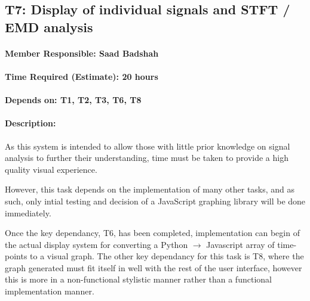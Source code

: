 \documentclass[
  paper=a4,
  ,captions=tableheading
]{scrartcl}
\begin{document}
\newpage
\hypertarget{t7-display-of-individual-signals-and-stft-emd-analysis}{%
\subsection{T7: Display of individual signals and STFT / EMD
analysis}\label{t7-display-of-individual-signals-and-stft-emd-analysis}}

\hypertarget{member-responsible-saad-badshah}{%
\paragraph{Member Responsible: Saad
Badshah}\label{member-responsible-saad-badshah}}

\hypertarget{time-required-estimate-20-hours-2}{%
\paragraph{Time Required (Estimate): 20
hours}\label{time-required-estimate-20-hours-2}}

\hypertarget{depends-on-t1-t2-t3-t6-t8}{%
\paragraph{Depends on: T1, T2, T3, T6,
T8}\label{depends-on-t1-t2-t3-t6-t8}}

\hypertarget{description-5}{%
\paragraph{Description:}\label{description-5}}

As this system is intended to allow those with little prior knowledge on
signal analysis to further their understanding, time must be taken to
provide a high quality visual experience.

However, this task depends on the implementation of many other tasks,
and as such, only intial testing and decision of a JavaScript graphing
library will be done immediately.

Once the key dependancy, T6, has been completed, implementation can
begin of the actual display system for converting a
Python $\rightarrow$ Javascript array of time-points to a visual graph.
The other key dependancy for this task is T8, where the graph generated
must fit itself in well with the rest of the user interface, however
this is more in a non-functional stylistic manner rather than a
functional implementation manner.
\end{document}
